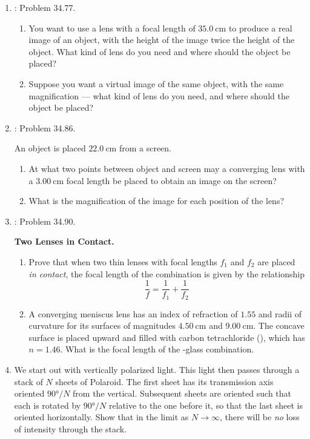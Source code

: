 \documentclass[../psets.tex]{subfiles}
\begin{document}
\begin{enumerate}[label={\arabic*)}]
    \item \textcite{bib:YoungFreedman}: Problem 34.77.\par
    \begin{enumerate}
        \item You want to use a lens with a focal length of $\SI{35.0}{\centi\meter}$ to produce a real image of an object, with the height of the image twice the height of the object. What kind of lens do you need and where should the object be placed?
        \item Suppose you want a virtual image of the same object, with the same magnification --- what kind of lens do you need, and where should the object be placed?
    \end{enumerate}
    \item \textcite{bib:YoungFreedman}: Problem 34.86.\par
    An object is placed $\SI{22.0}{\centi\meter}$ from a screen.
    \begin{enumerate}
        \item At what two points between object and screen may a converging lens with a $\SI{3.00}{\centi\meter}$ focal length be placed to obtain an image on the screen?
        \item What is the magnification of the image for each position of the lens?
    \end{enumerate}
    \item \textcite{bib:YoungFreedman}: Problem 34.90.\par
    \textbf{Two Lenses in Contact.}
    \begin{enumerate}
        \item Prove that when two thin lenses with focal lengths $f_1$ and $f_2$ are placed \emph{in contact}, the focal length of the combination is given by the relationship
        \begin{equation*}
            \frac{1}{f} = \frac{1}{f_1}+\frac{1}{f_2}
        \end{equation*}
        \item A converging meniscus lens has an index of refraction of $1.55$ and radii of curvature for its surfaces of magnitudes $\SI{4.50}{\centi\meter}$ and $\SI{9.00}{\centi\meter}$. The concave surface is placed upward and filled with carbon tetrachloride (), which has $n=1.46$. What is the focal length of the -glass combination.
    \end{enumerate}
    \item We start out with vertically polarized light. This light then passes through a stack of $N$ sheets of Polaroid. The first sheet has its transmission axis oriented $\ang{90}/N$ from the vertical. Subsequent sheets are oriented such that each is rotated by $\ang{90}/N$ relative to the one before it, so that the last sheet is oriented horizontally. Show that in the limit as $N\to\infty$, there will be \emph{no} loss of intensity through the stack.
\end{enumerate}
\end{document}
